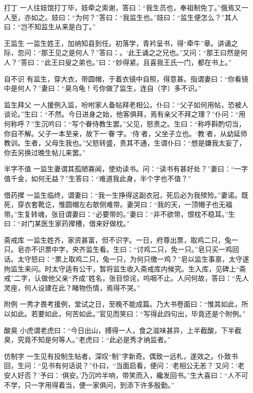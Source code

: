 \documentclass[12pt,UTF8]{ctexbook}
\begin{document}
打丁
一人往妓馆打丁毕，妓牵之索谢，答曰：“我生员也，奉祖制免丁。”俄焉又一人至，亦如之。妓曰：“为何？”答曰：“我监生也。”妓曰：“监生便怎么？”其人曰：“岂不知监生从来是白丁。”

王监生
一监生姓王，加纳知县到任。初落学，青衿呈书，得“牵牛”章。讲诵之际，忽问：“那王见之是何人？”答曰：。‘此王诵之之兄也。”又问：“那王曰然是何人？”答曰：“此王曰叟之弟也。”曰：“妙得紧。且喜我王氏一门，都在书上。”

自不识
有监生，穿大衣，带圆帽，于着衣镜中自照，得意甚。指谓妻曰：“你看镜中是何人？”妻曰：“臭乌龟！亏你做了监生，连自（字）多不识。”

监生拜父
一人援例入监，吩咐家人备帖拜老相公。仆曰：“父子如何用帖，恐被人谈论。”生曰：“不然。今日进身之始，他客俱拜，焉有亲父不拜之理？”仆问：“用何称呼？”生沉吟曰：“写个眷侍教生罢。”父见，怒责之。生曰：“称呼斟酌切当，你自不解。父子一本至亲，故下一‘眷’字。‘侍’者，父坐子立也。‘教’者，从幼延师教训。生者，父母生我也。”父怒转盛，责其不通，生谓仆曰：“想是嫌我太妄了，你去另换过晚生帖儿来罢。”

半字不值
一监生妻谓其孤陋寡闻，使劝读书。问：“读书有甚好处？”妻曰：“一字值千金，如何无益？”生答曰：“难道我此身，半个字也不值？”

借药撵
一监生临终，谓妻曰：“我一生挣得这副衣冠，死后必为我殡殓。”妻诺。既死，穿衣套靴讫，惟圆帽左右欹侧难带。妻哭曰：“我的天，一顶帽子也无福带。”生复转魂，张目谓妻曰：“必要带的。”妻曰：“非不欲带，恨枕不稳耳。”生曰：“对门某医生家药撵槽，借来好做枕。”

斋戒库
一监生姓齐，家资甚富，但不识字。一日，府尊出票，取鸡二只，兔一只。皂亦不识票中字，央齐监生看。生曰：“讨鸡二只，免一只。”皂只买一鸡回话。太守怒曰：“票上取鸡二只，兔一只，为何只缴一鸡？”皂以监生事禀，太守遂拘监生来问。时太守适有公干，暂将监生收入斋戒库内候究。生入库，见碑上“斋戒”二字，认做他父亲“齐成”姓名，张目惊诧，呜咽不止。人问何故，答曰：“先人灵座，何人设建在此？睹物伤情，焉得不哭。”

附例
一秀才畏考援例，堂试之日，至晚不能成篇。乃大书卷面曰：“惟其如此，所以如此。若要如此，何苦如此。”官见而笑曰：“写得此四句出，毕竟还是个附例。”

酸臭
小虎谓老虎曰：“今日出山，搏得一人，食之滋味甚异，上半截酸，下半截臭，究竟不知是何等人。”老虎曰：“此必是秀才纳监者。”

仿制字
一生见有投制生帖者，深叹“制”字新奇。偶致一远札，遂效之。仆致书回，生问：“见书有何话说？”仆曰，“当面启看，便问：‘老相公无恙？’又问：‘老安人好否？’予曰：‘俱安。’乃沉吟半响，带笑而入，纔发回书。”生大喜曰：“人不可不学，只一字用得着当，便一家俱问，到添下许多殷勤。”
\end{document}
